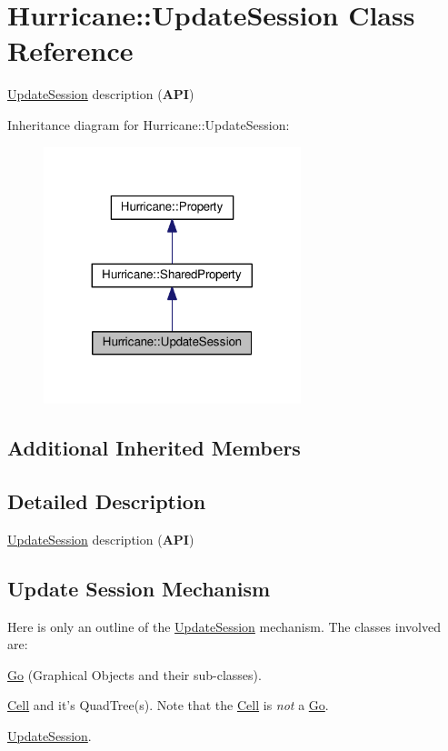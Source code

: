 \hypertarget{classHurricane_1_1UpdateSession}{\section{Hurricane\-:\-:Update\-Session Class Reference}
\label{classHurricane_1_1UpdateSession}
}


\hyperlink{classHurricane_1_1UpdateSession}{Update\-Session} description ({\bfseries A\-P\-I})  




Inheritance diagram for Hurricane\-:\-:Update\-Session\-:\nopagebreak
\begin{figure}[H]
\begin{center}
\leavevmode
\includegraphics[width=212pt]{classHurricane_1_1UpdateSession__inherit__graph}
\end{center}
\end{figure}
\subsection*{Additional Inherited Members}


\subsection{Detailed Description}
\hyperlink{classHurricane_1_1UpdateSession}{Update\-Session} description ({\bfseries A\-P\-I}) 

\hypertarget{classHurricane_1_1UpdateSession_secUpdateSessionMechanism}{}\subsection{Update Session Mechanism}\label{classHurricane_1_1UpdateSession_secUpdateSessionMechanism}
Here is only an outline of the \hyperlink{classHurricane_1_1UpdateSession}{Update\-Session} mechanism. The classes involved are\-:
\begin{DoxyItemize}
\item \hyperlink{classHurricane_1_1Go}{Go} (Graphical Objects and their sub-\/classes).
\item \hyperlink{classHurricane_1_1Cell}{Cell} and it's Quad\-Tree(s). Note that the \hyperlink{classHurricane_1_1Cell}{Cell} is {\itshape not} a \hyperlink{classHurricane_1_1Go}{Go}.
\item \hyperlink{classHurricane_1_1UpdateSession}{Update\-Session}.
\end{DoxyItemize}

